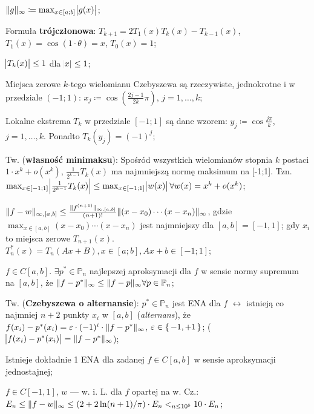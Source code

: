
\entry
$\|g\|_\infty \coloneqq \max_{x \in [a;b]} \abs{g(x)}$;

\entry
Formuła \textbf{trójczłonowa}:
$T_{k + 1} = 2T_1(x)T_k(x) - T_{k-1}(x)$,
$T_1(x) = \cos(1 \cdot \theta)=x$,
$T_0(x) = 1$;

\entry
$\abs{T_k(x)} \leq 1$
dla
$\abs{x} \leq 1$;

\entry
Miejsca zerowe $k$-tego wielomianu Czebyszewa są rzeczywiste, jednokrotne i w przedziale $(-1;1)$:
$x_j \coloneqq \cos(\frac{2j-1}{2k}\pi)$, 
$j=1,\ldots,k$;

\entry
Lokalne ekstrema $T_k$ w przedziale $[-1;1]$ są dane wzorem:
$y_j \coloneqq \cos \frac{j\pi}{k}$,
$j=1,\ldots,k$.
Ponadto
$T_k(y_j) = (-1)^j$;

\entry
Tw. (\textbf{własność minimaksu}):
Spośród wszystkich wielomianów stopnia $k$ postaci
$1 \cdot x^k + o(x^k)$,
$\frac{1}{2^{k-1}} T_k(x)$
ma najmniejszą normę maksimum na [-1;1].
Tzn.
$\max_{x \in [-1;1]} \abs{\frac{1}{2^{k-1}} T_k(x)} \leq 
\max_{x \in [-1;1]} \abs{w(x)} 
\forall w(x) = x^k + o(x^k)$;

\entry
$\|f-w\|_{\infty, [a,b]} \leq 
\frac{\|f^{(n+1)}\|_{\infty, [a,b]}}{(n+1)!} 
\|(x-x_0) \cdots (x - x_n)\|_\infty$, 
gdzie
$\max_{x\in[a,b]} (x-x_0)\cdots(x-x_n)$
jest najmniejszy dla 
$[a,b] = [-1,1]$;
gdy $x_i$ to miejsca zerowe $T_{n + 1}(x)$.
\entry
$T^{*}_n(x) = T_n(Ax+B), x \in [a;b], Ax+b \in [-1;1]$;

\entry
$f \in C[a,b]$.
$\exists p^{*} \in \mathbb{P}_n$ 
najlepszej aproksymacji dla $f$ w sensie normy supremum na $[a,b]$, że
$\|f - p^{*}\|_\infty \leq \|f - p\|_\infty \forall p\in \mathbb{P}_n$;

\entry
Tw. (\textbf{Czebyszewa o alternansie}):
$p^{*} \in \mathbb{P}_n$
jest ENA dla $f$
$\leftrightarrow$
istnieją co najmniej $n+2$ punkty $x_i$ w $[a,b]$ (\textit{alternans}), że
$f(x_i) - p^{*}(x_i) = \varepsilon \cdot (-1)^i \cdot \|f - p^{*}\|_\infty$,
$\varepsilon \in \set{-1,+1}$;
($\abs{f(x_i) - p^{*}(x_i)} = \|f - p^{*}\|_\infty$);

\entry
Istnieje dokładnie 1 ENA dla zadanej 
$f\in C[a,b]$ 
w sensie aproksymacji jednostajnej;


\entry
$f \in C[-1,1]$,
$w$ --- w. i. L. dla $f$ opartej na w. Cz.:
$E_n \leq
\|f - w\|_\infty \leq
(2 + 2 \ln(n + 1) / \pi)\cdot E_n <_{n \leq 10^5}
10\cdot E_n$;
